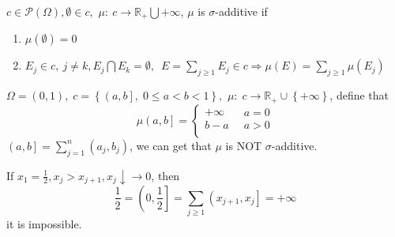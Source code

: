 \begin{definition}
	$ c \in \mathcal{P}\left(\Omega\right), \emptyset \in c, $ $ \mu: \  c \to \mathbb{R}_{+} \bigcup {+ \infty }$, $ \mu $ is $ \sigma $-additive if  
	\begin{enumerate}
		\item $\mu \left( \emptyset  \right) = 0$
		\item ${E_j}\in c, \ j \ne k, E_{j} \bigcap E_{k} = \emptyset,\ \;E = \sum\limits_{j \ge  1} {{E_j}}  \in c \Rightarrow \mu \left( E \right) = \sum\limits_{j \ge 1} {\mu \left( {{E_j}} \right)} $
	\end{enumerate}
\end{definition}

\begin{example}
	$\Omega  = \left( {0,1} \right),\;c = \left\{ {\left( {a,b} \right],\;0 \leqslant a < b < 1} \right\},$ $\mu :\;c \to {\mathbb{R}_ + } \cup \left\{ { + \infty } \right\}$,  define that
	\begin{equation}
	\mu \left( {a,b} \right] = \left\{ {\begin{matrix}
		{ + \infty }  \\ 
		{b - a}  \\ 	
		\end{matrix} } \right.\;\;\begin{matrix}
	{a = 0}  \\ 
	{a > 0}  \\ 
	\end{matrix} 
	\end{equation}
	$\left( {a,b} \right] = \sum\limits_{j = 1}^n {\left( {{a_j},{b_j}} \right)} $,  we can get that  $ \mu $ is NOT $ \sigma $-additive.
	
	If  $ {x_1} = \frac{1}{2},{x_j} > {x_{j + 1}},{x_j} \downarrow  \to 0 $, then 
	\begin{equation}
	\frac{1}{2} = \left( {0,\frac{1}{2}} \right] = \sum\limits_{j \geqslant 1} {\left( {{x_{j + 1}},{x_j}} \right]}  =  + \infty 
	\end{equation}
	it is impossible.
\end{example}

